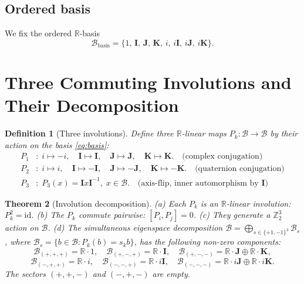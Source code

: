 \documentclass[12pt,a4paper]{article}
\newtheorem{theorem}{Theorem}[section]
\newtheorem{definition}[theorem]{Definition}
\theoremstyle{remark}
\newcommand{\B}{\mathcal{B}}          %
\newcommand{\R}{\mathbb{R}}
\begin{document}
\subsection{Ordered basis}

We fix the ordered $\R$-basis
\begin{equation}
  \label{eq:basis}
  \mathcal{B}_\mathrm{basis} = \{1,\,\mathbf{I},\,\mathbf{J},\,\mathbf{K},\,
    i,\,i\mathbf{I},\,i\mathbf{J},\,i\mathbf{K}\}.
\end{equation}

\section{Three Commuting Involutions and Their Decomposition}
\label{sec:involutions}

\begin{definition}[Three involutions]
  \label{def:involutions}
  Define three $\R$-linear maps $P_k:\B\to\B$ by their action on the basis
  \eqref{eq:basis}:
  \begin{align*}
    P_1 &:\; i\mapsto -i,\quad \mathbf{I}\mapsto\mathbf{I},\quad
      \mathbf{J}\mapsto\mathbf{J},\quad \mathbf{K}\mapsto\mathbf{K}.
      \quad\text{(complex conjugation)}\\
    P_2 &:\; i\mapsto i,\quad \mathbf{I}\mapsto-\mathbf{I},\quad
      \mathbf{J}\mapsto-\mathbf{J},\quad \mathbf{K}\mapsto-\mathbf{K}.
      \quad\text{(quaternion conjugation)}\\
    P_3 &:\; P_3(x) = \mathbf{I}x\mathbf{I}^{-1},\; x\in\B.
      \quad\text{(axis-flip, inner automorphism by }\mathbf{I})
  \end{align*}
\end{definition}

\begin{theorem}[Involution decomposition]
  \label{thm:involution_decomp}
  (a) Each $P_k$ is an $\R$-linear involution: $P_k^2 = \mathrm{id}$.
  (b) The $P_k$ commute pairwise: $[P_i,P_j]=0$.
  (c) They generate a $\mathbb{Z}_2^3$ action on $\B$.
  (d) The simultaneous eigenspace decomposition
  $\B = \bigoplus_{s\in\{+1,-1\}^3} \B_s$, where $\B_s = \{b\in\B:P_k(b)=s_k b\}$,
  has the following non-zero components:
  \[
    \B_{(+,+,+)} = \R\cdot 1,\quad
    \B_{(+,-,+)} = \R\cdot\mathbf{I},\quad
    \B_{(+,-,-)} = \R\cdot\mathbf{J}\oplus\R\cdot\mathbf{K},
  \]
  \[
    \B_{(-,+,+)} = \R\cdot i,\quad
    \B_{(-,-,+)} = \R\cdot i\mathbf{I},\quad
    \B_{(-,-,-)} = \R\cdot i\mathbf{J}\oplus\R\cdot i\mathbf{K}.
  \]
  The sectors $(+,+,-)$ and $(-,+,-)$ are empty.
\end{theorem}
\end{document}
